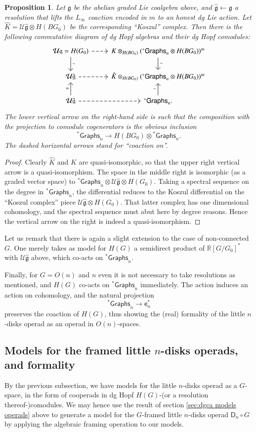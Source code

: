 \documentclass[a4paper]{amsart}
\theoremstyle{plain}
\newtheorem{prop}[thm]{Proposition}
\theoremstyle{definition}
\newcommand{\alg}[1]{\mathfrak{{#1}}}
\newcommand{\R}{{\mathbb{R}}}
\newcommand{\Graphs}{{\mathsf{Graphs}}}
\newcommand{\mU}{\mathcal{U}}
\newcommand{\e}{\mathsf{e}}
\newcommand{\stG}{{}^*\Graphs}
\newcommand{\lD}{\mathsf{D}}
\begin{document}
\begin{prop}
 Let $\alg g$ be the abelian graded Lie coalgebra above, and $\hat{\alg g}\leftarrow \alg g$ a resolution that lifts the $L_\infty$ coaction encoded in $m$ to an honest dg Lie action.
Let $\hat K=\mU \hat{\alg g}\otimes H(BG_0)$ be the corresponding ``Koszul'' complex.
Then there is the following commutative diagram of dg Hopf algebras and their dg Hopf comodules:
\[
 \begin{tikzcd}
  \mU \alg g=H(G_0) \ar[dashed]{r} \ar{d}{\sim} & K\otimes_{H(BG_0)} (\stG_n\otimes H(BG_0))^m  \ar{d}{\sim}\\
  \mU \hat{\alg g} \ar[dashed]{r}  & \hat K\otimes_{H(BG_0)} (\stG_n\otimes H(BG_0))^m \\
  \mU \hat{\alg g} \ar[dashed]{r} \ar{u}{=} & \stG_n \ar{u}{\sim}.
 \end{tikzcd}
\]
The lower vertical arrow on the right-hand side is such that the composition with the projection to comodule cogenerators is the obvious inclusion
\[
 \stG_n \to H(BG_0) \otimes \stG_n.
\]
The dashed horizontal arrows stand for ``coaction on''.
\end{prop}
\begin{proof}
Clearly $\hat K$ and $K$ are quasi-isomorphic, so that the upper right vertical arrow is a quasi-isomorphism.
The space in the middle right is isomorphic (as a graded vector space) to $\stG_n\otimes \mU \hat{\alg g} \otimes H(G_0)$. Taking a spectral sequence on the degree in $\stG_n$, the differential reduces to the Koszul differential on the ``Koszul complex'' piece $\mU \hat{\alg g} \otimes H(G_0)$. That latter complex has one dimensional cohomology, and the spectral sequence must abut here by degree reasons. Hence the vertical arrow on the right is indeed a quasi-isomorphism.
\end{proof}

Let us remark that there is again a slight extension to the case of non-connected $G$.
One merely takes as model for $H(G)$ a semidirect product of $\R[G/G_0]^*$ with $\mU \hat{\alg g}$ above, which co-acts on $\stG_n$.

Finally, for $G=O(n)$ and $n$ even it is not necessary to take resolutions as mentioned, and $H(G)$ co-acts on $\stG_n$ immediately.
The action induces an action on cohomology, and the natural projection
\[
 \stG_n \to \e_n^* 
\]
preserves the coaction of $H(G)$, thus showing the (real) formality of the little $n$-disks operad as an operad in $O(n)$-spaces.


\subsection{Models for the framed little \texorpdfstring{$n$}{n}-disks operads, and formality}\label{sec:models formality}
By the previous subsection, we have models for the little $n$-disks operad as a $G$-space, in the form of cooperads in dg Hopf $H(G)$-(or a resolution thereof-)comodules.
We may hence use the result of section \ref{sec:dgca models operads} above to generate a model for the $G$-framed little $n$-disks operad $\lD_n\circ G$ by applying the algebraic framing operation to our models.
\end{document}
